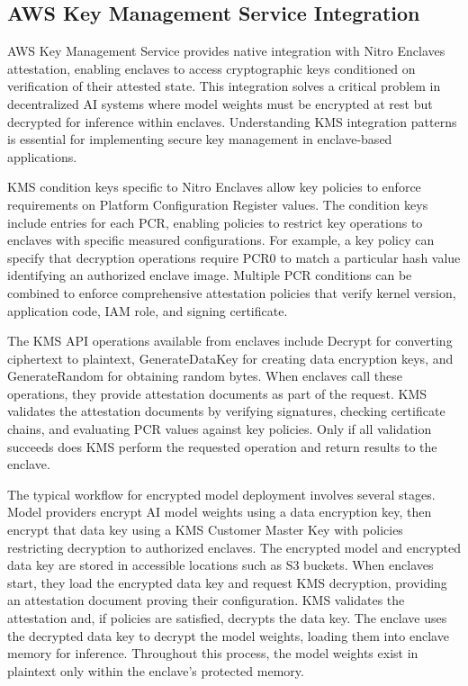 \subsection{AWS Key Management Service Integration}

AWS Key Management Service provides native integration with Nitro Enclaves attestation, enabling enclaves to access cryptographic keys conditioned on verification of their attested state. This integration solves a critical problem in decentralized AI systems where model weights must be encrypted at rest but decrypted for inference within enclaves. Understanding KMS integration patterns is essential for implementing secure key management in enclave-based applications.

KMS condition keys specific to Nitro Enclaves allow key policies to enforce requirements on Platform Configuration Register values. The condition keys include entries for each PCR, enabling policies to restrict key operations to enclaves with specific measured configurations. For example, a key policy can specify that decryption operations require PCR0 to match a particular hash value identifying an authorized enclave image. Multiple PCR conditions can be combined to enforce comprehensive attestation policies that verify kernel version, application code, IAM role, and signing certificate.

The KMS API operations available from enclaves include Decrypt for converting ciphertext to plaintext, GenerateDataKey for creating data encryption keys, and GenerateRandom for obtaining random bytes. When enclaves call these operations, they provide attestation documents as part of the request. KMS validates the attestation documents by verifying signatures, checking certificate chains, and evaluating PCR values against key policies. Only if all validation succeeds does KMS perform the requested operation and return results to the enclave.

The typical workflow for encrypted model deployment involves several stages. Model providers encrypt AI model weights using a data encryption key, then encrypt that data key using a KMS Customer Master Key with policies restricting decryption to authorized enclaves. The encrypted model and encrypted data key are stored in accessible locations such as S3 buckets. When enclaves start, they load the encrypted data key and request KMS decryption, providing an attestation document proving their configuration. KMS validates the attestation and, if policies are satisfied, decrypts the data key. The enclave uses the decrypted data key to decrypt the model weights, loading them into enclave memory for inference. Throughout this process, the model weights exist in plaintext only within the enclave's protected memory.

